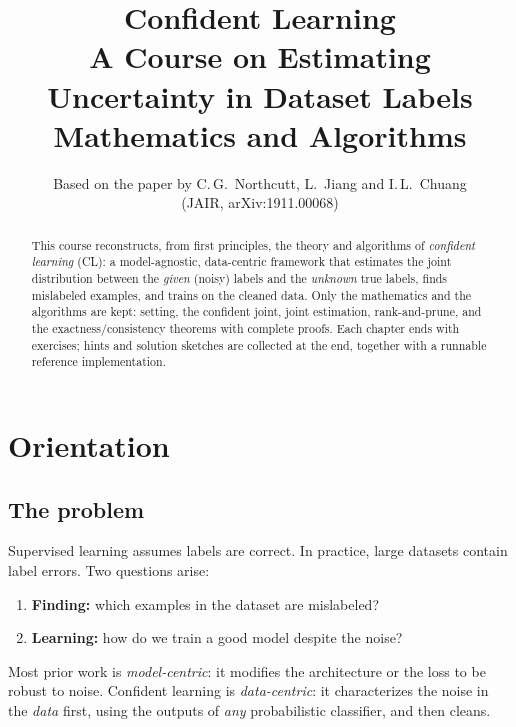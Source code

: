 \documentclass[11pt,a4paper]{report}
\title{\textbf{Confident Learning}\\[4pt]\Large A Course on Estimating Uncertainty in Dataset Labels\\[8pt]
\large Mathematics and Algorithms}
\author{Based on the paper by C.\,G.\ Northcutt, L.\ Jiang and I.\,L.\ Chuang\\(JAIR, arXiv:1911.00068)}
\date{}
\newcommand{\1}{\mathbf 1}
\theoremstyle{definition}
\theoremstyle{plain}
\theoremstyle{remark}
\begin{document}
\maketitle

\begin{abstract}
\noindent This course reconstructs, from first principles, the theory and algorithms of \emph{confident learning} (CL): a model-agnostic, data-centric framework that estimates the joint distribution between the \emph{given} (noisy) labels and the \emph{unknown} true labels, finds mislabeled examples, and trains on the cleaned data. Only the mathematics and the algorithms are kept: setting, the confident joint, joint estimation, rank-and-prune, and the exactness/consistency theorems with complete proofs. Each chapter ends with exercises; hints and solution sketches are collected at the end, together with a runnable reference implementation.
\end{abstract}

\tableofcontents

\chapter{Orientation}

\section{The problem}
Supervised learning assumes labels are correct. In practice, large datasets contain label errors. Two questions arise:
\begin{enumerate}[label=(\alph*)]
  \item \textbf{Finding:} which examples in the dataset are mislabeled?
  \item \textbf{Learning:} how do we train a good model despite the noise?
\end{enumerate}
Most prior work is \emph{model-centric}: it modifies the architecture or the loss to be robust to noise. Confident learning is \emph{data-centric}: it characterizes the noise in the \emph{data} first, using the outputs of \emph{any} probabilistic classifier, and then cleans.
\end{document}
